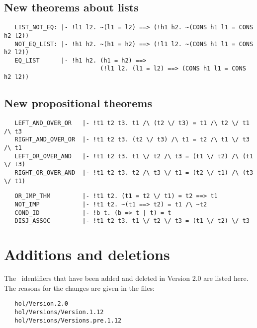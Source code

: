 \subsection{New theorems about lists}

\begin{hol}\begin{verbatim}
   LIST_NOT_EQ: |- !l1 l2. ~(l1 = l2) ==> (!h1 h2. ~(CONS h1 l1 = CONS h2 l2))
   NOT_EQ_LIST: |- !h1 h2. ~(h1 = h2) ==> (!l1 l2. ~(CONS h1 l1 = CONS h2 l2))
   EQ_LIST      |- !h1 h2. (h1 = h2) ==>  
                           (!l1 l2. (l1 = l2) ==> (CONS h1 l1 = CONS h2 l2))
\end{verbatim}\end{hol}

\subsection{New propositional theorems}

\begin{hol}\begin{verbatim}
   LEFT_AND_OVER_OR   |- !t1 t2 t3. t1 /\ (t2 \/ t3) = t1 /\ t2 \/ t1 /\ t3
   RIGHT_AND_OVER_OR  |- !t1 t2 t3. (t2 \/ t3) /\ t1 = t2 /\ t1 \/ t3 /\ t1
   LEFT_OR_OVER_AND   |- !t1 t2 t3. t1 \/ t2 /\ t3 = (t1 \/ t2) /\ (t1 \/ t3)
   RIGHT_OR_OVER_AND  |- !t1 t2 t3. t2 /\ t3 \/ t1 = (t2 \/ t1) /\ (t3 \/ t1)
\end{verbatim}\end{hol}
\begin{hol}\begin{verbatim}
   OR_IMP_THM         |- !t1 t2. (t1 = t2 \/ t1) = t2 ==> t1
   NOT_IMP            |- !t1 t2. ~(t1 ==> t2) = t1 /\ ~t2
   COND_ID            |- !b t. (b => t | t) = t
   DISJ_ASSOC         |- !t1 t2 t3. t1 \/ t2 \/ t3 = (t1 \/ t2) \/ t3 
\end{verbatim}\end{hol}


\section{Additions and deletions}\label{adddel}

The \ML\ identifiers that have been added and deleted in Version 2.0
are listed here. The reasons for the changes are given in the files:

\begin{hol}\begin{verbatim}
   hol/Version.2.0
   hol/Versions/Version.1.12
   hol/Versions/Versions.pre.1.12
\end{verbatim}\end{hol}


